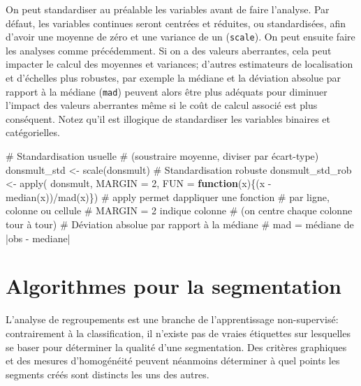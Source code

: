 \documentclass[
  11pt,
  letterpaper,
]{scrbook}
\newenvironment{Shaded}{\begin{snugshade}}{\end{snugshade}}
\newcommand{\AttributeTok}[1]{\textcolor[rgb]{0.40,0.45,0.13}{#1}}
\newcommand{\CommentTok}[1]{\textcolor[rgb]{0.37,0.37,0.37}{#1}}
\newcommand{\ControlFlowTok}[1]{\textcolor[rgb]{0.00,0.23,0.31}{\textbf{#1}}}
\newcommand{\DecValTok}[1]{\textcolor[rgb]{0.68,0.00,0.00}{#1}}
\newcommand{\FunctionTok}[1]{\textcolor[rgb]{0.28,0.35,0.67}{#1}}
\newcommand{\NormalTok}[1]{\textcolor[rgb]{0.00,0.23,0.31}{#1}}
\newcommand{\OtherTok}[1]{\textcolor[rgb]{0.00,0.23,0.31}{#1}}
\newcommand{\SpecialCharTok}[1]{\textcolor[rgb]{0.37,0.37,0.37}{#1}}
\theoremstyle{definition}
\theoremstyle{remark}
\begin{document}
On peut standardiser au préalable les variables avant de faire
l'analyse. Par défaut, les variables continues seront centrées et
réduites, ou standardisées, afin d'avoir une moyenne de zéro et une
variance de un (\texttt{scale}). On peut ensuite faire les analyses
comme précédemment. Si on a des valeurs aberrantes, cela peut impacter
le calcul des moyennes et variances; d'autres estimateurs de
localisation et d'échelles plus robustes, par exemple la médiane et la
déviation absolue par rapport à la médiane (\texttt{mad}) peuvent alors
être plus adéquats pour diminuer l'impact des valeurs aberrantes même si
le coût de calcul associé est plus conséquent. Notez qu'il est illogique
de standardiser les variables binaires et catégorielles.

\begin{Shaded}
\begin{Highlighting}[]
\CommentTok{\# Standardisation usuelle }
\CommentTok{\# (soustraire moyenne, diviser par écart{-}type)}
\NormalTok{donsmult\_std }\OtherTok{\textless{}{-}} \FunctionTok{scale}\NormalTok{(donsmult)}
\CommentTok{\# Standardisation robuste}
\NormalTok{donsmult\_std\_rob }\OtherTok{\textless{}{-}} \FunctionTok{apply}\NormalTok{(}
\NormalTok{  donsmult, }
  \AttributeTok{MARGIN =} \DecValTok{2}\NormalTok{, }
  \AttributeTok{FUN =} \ControlFlowTok{function}\NormalTok{(x)\{(x }\SpecialCharTok{{-}} \FunctionTok{median}\NormalTok{(x))}\SpecialCharTok{/}\FunctionTok{mad}\NormalTok{(x)\})}
\CommentTok{\# apply permet d\textquotesingle{}appliquer une fonction}
\CommentTok{\# par ligne, colonne ou cellule}
\CommentTok{\# MARGIN = 2 indique colonne }
\CommentTok{\# (on centre chaque colonne tour à tour)}
\CommentTok{\# Déviation absolue par rapport à la médiane}
\CommentTok{\# mad = médiane de |obs {-} mediane|}
\end{Highlighting}
\end{Shaded}

\section{Algorithmes pour la
segmentation}\label{algorithmes-pour-la-segmentation}

L'analyse de regroupements est une branche de l'apprentissage
non-supervisé: contrairement à la classification, il n'existe pas de
vraies étiquettes sur lesquelles se baser pour déterminer la qualité
d'une segmentation. Des critères graphiques et des mesures d'homogénéité
peuvent néanmoins déterminer à quel points les segments créés sont
distincts les uns des autres.
\end{document}
